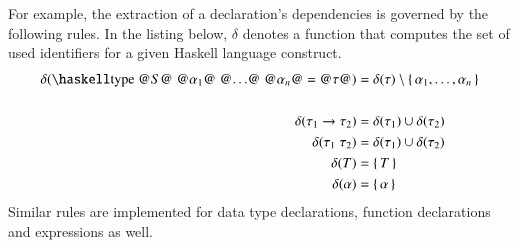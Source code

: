 For example, the extraction of a  declaration's dependencies is governed by the following rules.
In the listing below, $\delta$ denotes a function that computes the set of used identifiers for a given Haskell language construct.
\begin{align*}
  \delta(\haskellM{type @$S$@ @$\alpha_1$@ @$\ldots$@ @$\alpha_n$@ = @$\tau$@})
    &= \delta(\tau)
      \setminus \{\, \alpha_1, \ldots, \alpha_n \,\}
  \\
  \\
  \delta(\tau_1 \rightarrow \tau_2) &= \delta(\tau_1) \cup \delta(\tau_2) \\
  \delta(\tau_1\;\tau_2)            &= \delta(\tau_1) \cup \delta(\tau_2) \\
  \delta(T)                         &= \{\, T \,\} \\
  \delta(\alpha)                    &= \{\, \alpha \,\}
\end{align*}
Similar rules are implemented for data type declarations, function declarations and expressions as well.
